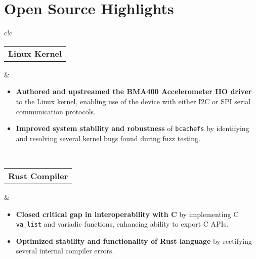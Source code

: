 \documentclass[a4paper,skipsamekey,11pt,english]{curve}
\begin{document}
  \section{Open Source Highlights}
  \begin{center}
    {
    \setlength{\tabcolsep}{1em}
    \begin{tabular}{c!{\color{blue}\vrule}c}
      \vspace{1pt}
      {
       \begin{tabular}{c}
         \color{base03}\textbf{Linux Kernel}
       \end{tabular}
      } & {
        \begin{minipage}{5in}
          \vspace{5pt}
          \begin{itemize}
            \item \textbf{Authored and upstreamed the BMA400 Accelerometer IIO
            driver} to the Linux kernel, enabling use of the device with either
            I2C or SPI serial communication protocols.
            \item \textbf{Improved system stability and robustness} of
            \texttt{bcachefs} by identifying and resolving several kernel
            bugs found during fuzz testing.
          \end{itemize}
        \end{minipage}
      }
      \\
      \hline
      {
       \begin{tabular}{c}
         \color{base03}\textbf{Rust Compiler}
       \end{tabular}
      } & {
        \begin{minipage}{5in}
          \vspace{5pt}
          \begin{itemize}
            \item \textbf{Closed critical gap in interoperability with C} by
            implementing C \texttt{va\_list} and variadic functions, enhancing
            ability to export C APIs.
            \item \textbf{Optimized stability and functionality of Rust language}
            by rectifying several internal compiler errors.
          \end{itemize}
        \end{minipage}
        \vspace{1pt}
      }
      \\

\end{tabular}}
\end{center}
\end{document}
